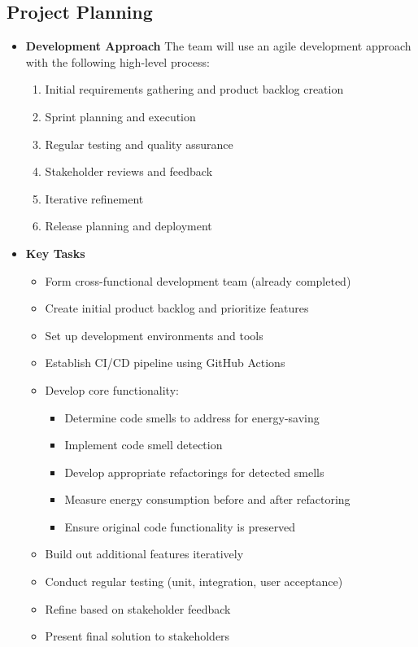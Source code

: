 \documentclass[12pt]{article}
\begin{document}
\subsection{Project Planning}
\begin{itemize}

  \item \textbf{Development Approach}
    The team will use an agile development approach with the
    following high-level process:
    \begin{enumerate}
      \item Initial requirements gathering and product backlog creation
      \item Sprint planning and execution
      \item Regular testing and quality assurance
      \item Stakeholder reviews and feedback
      \item Iterative refinement
      \item Release planning and deployment
    \end{enumerate}

  \item \textbf{Key Tasks}
    \begin{itemize}
      \item Form cross-functional development team (already completed)
      \item Create initial product backlog and prioritize features
      \item Set up development environments and tools
      \item Establish CI/CD pipeline using GitHub Actions
      \item Develop core functionality:
        \begin{itemize}
          \item Determine code smells to address for energy-saving
          \item Implement code smell detection
          \item Develop appropriate refactorings for detected smells
          \item Measure energy consumption before and after refactoring
          \item Ensure original code functionality is preserved
        \end{itemize}
      \item Build out additional features iteratively
      \item Conduct regular testing (unit, integration, user acceptance)
      \item Refine based on stakeholder feedback
      \item Present final solution to stakeholders


\end{itemize}
\end{itemize}
\end{document}
